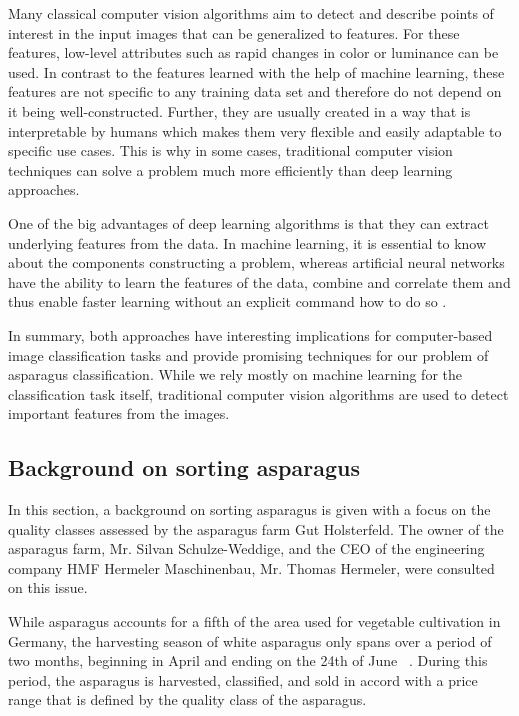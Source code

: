 Many classical computer vision algorithms aim to detect and describe points of interest in the input images that can be generalized to features. For these features, low-level attributes such as rapid changes in color or luminance can be used. In contrast to the features learned with the help of machine learning, these features are not specific to any training data set and therefore do not depend on it being well-constructed. Further, they are usually created in a way that is interpretable by humans which makes them very flexible and easily adaptable to specific use cases. This is why in some cases, traditional computer vision techniques can solve a problem much more efficiently than deep learning approaches.

One of the big advantages of deep learning algorithms is that they can extract underlying features from the data. In machine learning, it is essential to know about the components constructing a problem, whereas artificial neural networks have the ability to learn the features of the data, combine and correlate them and thus enable faster learning without an explicit command how to do so \citep{LeCun2015}.

\bigskip
In summary, both approaches have interesting implications for computer-based image classification tasks and provide promising techniques for our problem of asparagus classification. While we rely mostly on machine learning for the classification task itself, traditional computer vision algorithms are used to detect important features from the images.


\subsection{Background on sorting asparagus}
\label{sec:BackgroundSortingAsparagus}

In this section, a background on sorting asparagus is given with a focus on the quality classes assessed by the asparagus farm Gut Holsterfeld. The owner of the asparagus farm, Mr. Silvan Schulze-Weddige, and the CEO of the engineering company HMF Hermeler Maschinenbau, Mr. Thomas Hermeler, were consulted on this issue.

\bigskip
While asparagus accounts for a fifth of the area used for vegetable cultivation in Germany, the harvesting season of white asparagus only spans over a period of two months, beginning in April and ending on the 24th of June ~\citep{spargelstatistik,nrw2018spargel}. During this period, the asparagus is harvested, classified, and sold in accord with a price range that is defined by the quality class of the asparagus.

